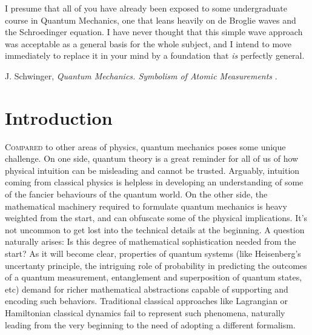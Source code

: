


\label{chp:fundamentals} 


\begin{refsection}
\begin{quoting}
   \openquote 
   I presume that all of you have already been exposed to some undergraduate
   course in Quantum Mechanics, one that leans heavily on de Broglie waves and
   the Schroedinger equation. I have never thought that this simple wave
   approach was acceptable as a general basis for the whole subject, and I
   intend to move immediately to replace it in your mind by a foundation that
   \emph{is} perfectly general.~\closequote
   \begin{flushright}
       J. Schwinger,
       \emph{Quantum Mechanics. Symbolism of Atomic Measurements}
       \textcite{Schwinger:2001}.
    \end{flushright}
\end{quoting}

\section{Introduction}

\lettrine{C}{ompared} 
to other areas of physics, quantum mechanics poses some unique challenge.
On one side, quantum theory is a great reminder for all of us of how physical intuition can be misleading and cannot be trusted. 
  Arguably,  intuition coming from classical physics is helpless in developing an understanding of some of the fancier behaviours of the quantum world. 
On the other side, the mathematical machinery required to formulate quantum mechanics is heavy weighted from the start,   and can obfuscate some of the physical implications. 
  It's not uncommon to get lost into the technical details at the beginning. 
A question naturally arises: Is this degree of mathematical sophistication  needed from the start?
  As it will become clear, properties of quantum systems (like Heisenberg's uncertanty principle, the intriguing role of probability in predicting the
outcomes of a quantum measurement, entanglement and superposition of quantum
  states, etc) demand for richer mathematical abstractions capable of supporting and
encoding such behaviors. Traditional classical approaches like Lagrangian or Hamiltonian classical dynamics fail 
to represent 
such phenomena, naturally leading from the very beginning to the need of adopting a different formalism. 



\end{refsection}
